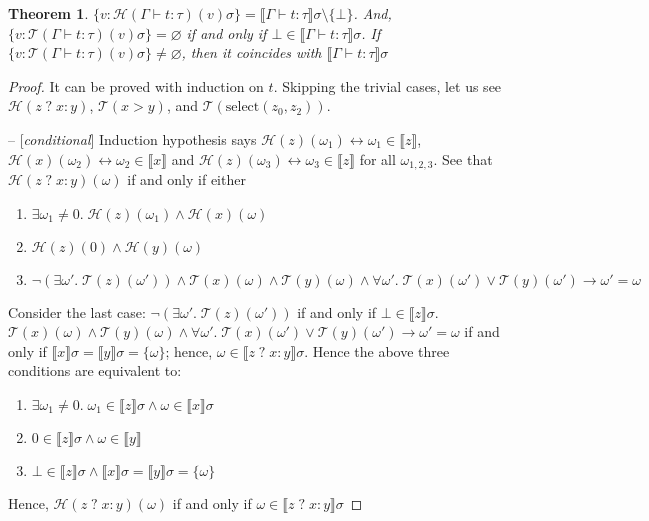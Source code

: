 \documentclass{article}
\newtheorem{theorem}{Theorem}
\newcommand{\select}{\text{select}}
\newcommand{\sem}[1]{\llbracket #1 \rrbracket }
\newcommand{\trans}[1]{\mathcal{T}( #1) }
\newcommand{\transh}[1]{\mathcal{H}( #1) }
\begin{document}
\begin{theorem}
\label{t:Defined}
$\{v : \transh{\Gamma\vdash t : \tau}(v)\sigma\} = \sem{\Gamma\vdash t : \tau}\sigma\setminus\{\bot\}$. And,
$\{v : \trans{\Gamma\vdash t : \tau}(v)\sigma\} = \varnothing$ if and only if $\bot\in\sem{\Gamma\vdash t : \tau}\sigma$.
If $\{v : \trans{\Gamma\vdash t : \tau}(v)\sigma\} \neq \varnothing$, then
it coincides with $\sem{\Gamma\vdash t : \tau}\sigma$
\end{theorem}
\begin{proof}
It can be proved with induction on $t$.
Skipping the trivial cases, let us see $\transh{z\;?\;x:y}$, $\trans{x>y}$, and $\trans{\select(z_0,z_2)}$.

\vspace{0.5em}
\noindent
-- [\textit{conditional}]\quad
Induction hypothesis says $\transh{z}(\omega_1) \leftrightarrow \omega_1\in\sem{z}$,
$\transh{x}(\omega_2) \leftrightarrow \omega_2 \in \sem{x}$ and
$\transh{z}(\omega_3) \leftrightarrow \omega_3 \in \sem{z}$
for all $\omega_{1,2,3}$.
See that $\transh{z\;?\;x:y}(\omega)$ if and only if either
\begin{enumerate}
\item
$\exists \omega_1\neq0.\; \transh{z}(\omega_1)\land\transh{x}(\omega) $
\item
$\transh{z}(0) \land \transh{y}(\omega)$
\item
$\neg (\exists \omega'.\;\trans{z}(\omega'))  \land \trans{x}(\omega)\land \trans{y}(\omega) 
\land \forall \omega'.\; \trans{x}(\omega') \lor \trans{y}(\omega') \to \omega' = \omega$
\end{enumerate}
Consider the last case:
 $\neg (\exists \omega'.\;\trans{z}(\omega'))$ if and only if $\bot\in\sem{z}\sigma$.
$\trans{x}(\omega)\land \trans{y}(\omega) 
\land \forall \omega'.\; \trans{x}(\omega') \lor \trans{y}(\omega') \to \omega' = \omega$ if and only if
$\sem{x}\sigma=\sem{y}\sigma = \{\omega\}$; hence, $\omega\in\sem{z\;?\;x:y}\sigma$.
Hence the above three conditions are equivalent to:
\begin{enumerate}
\item
$\exists \omega_1\neq0.\; \omega_1\in\sem{z}\sigma \land \omega\in\sem{x}\sigma $
\item
$0\in\sem{z}\sigma \land \omega\in\sem{y}$
\item
$\bot\in\sem{z}\sigma \land \sem{x}\sigma=\sem{y}\sigma=\{\omega\}$
\end{enumerate}
Hence, $\transh{z\;?\;x:y}(\omega)$ if and only if $\omega \in\sem{z\;?\;x:y}\sigma$


\end{proof}
\end{document}
